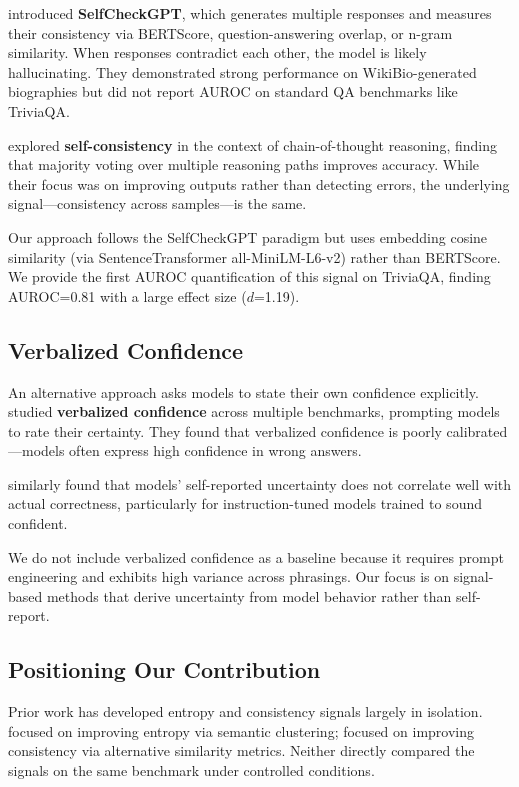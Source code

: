 \citet{manakul2023selfcheckgpt} introduced \textbf{SelfCheckGPT}, which generates multiple responses and measures their consistency via BERTScore, question-answering overlap, or n-gram similarity. When responses contradict each other, the model is likely hallucinating. They demonstrated strong performance on WikiBio-generated biographies but did not report AUROC on standard QA benchmarks like TriviaQA.

\citet{wang2023selfconsistency} explored \textbf{self-consistency} in the context of chain-of-thought reasoning, finding that majority voting over multiple reasoning paths improves accuracy. While their focus was on improving outputs rather than detecting errors, the underlying signal---consistency across samples---is the same.

Our approach follows the SelfCheckGPT paradigm but uses embedding cosine similarity (via SentenceTransformer all-MiniLM-L6-v2) rather than BERTScore. We provide the first AUROC quantification of this signal on TriviaQA, finding AUROC=0.81 with a large effect size ($d$=1.19).

\subsection{Verbalized Confidence}

An alternative approach asks models to state their own confidence explicitly. \citet{xiong2023can} studied \textbf{verbalized confidence} across multiple benchmarks, prompting models to rate their certainty. They found that verbalized confidence is poorly calibrated---models often express high confidence in wrong answers.

\citet{lin2022teaching} similarly found that models' self-reported uncertainty does not correlate well with actual correctness, particularly for instruction-tuned models trained to sound confident.

We do not include verbalized confidence as a baseline because it requires prompt engineering and exhibits high variance across phrasings. Our focus is on signal-based methods that derive uncertainty from model behavior rather than self-report.

\subsection{Positioning Our Contribution}

Prior work has developed entropy and consistency signals largely in isolation. \citet{kuhn2023semantic} focused on improving entropy via semantic clustering; \citet{manakul2023selfcheckgpt} focused on improving consistency via alternative similarity metrics. Neither directly compared the signals on the same benchmark under controlled conditions.

